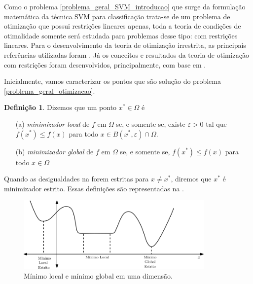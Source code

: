 \documentclass[12pt,a4paper]{scrartcl}
\theoremstyle{definition}%
\newtheorem{defi}{Definição}
\begin{document}
Como o problema \eqref{problema_geral_SVM_introducao} que surge da formulação matemática da técnica SVM para classificação trata-se de um problema de otimização que possui restrições lineares apenas, toda a teoria de condições de otimalidade somente será estudada para problemas desse tipo: com restrições lineares. Para o desenvolvimento da teoria de otimização irrestrita, as principais referências utilizadas foram \textcite{Izmailov2014ac,Ademir2013}. Já os conceitos e resultados da teoria de otimização com restrições foram desenvolvidos, principalmente, com base em \textcite{Ana1994,luenberger2008linear}.  

Inicialmente, vamos caracterizar os pontos que são solução do problema \eqref{problema_geral_otimizacao}.

\begin{defi} \label{defi:minimizador_local_global}
Dizemos que um ponto $x^{*} \in \Omega$ é
\begin{enumerate}
	\item[(a)] \emph{minimizador local} de $f$ em $\Omega$ se, e somente se, existe $\varepsilon >0$ tal que $f(x^{*}) \leq f(x)$ para todo $x \in B(x^{*}, \varepsilon) \cap \Omega$.

	\item[(b)] \emph{minimizador global} de $f$ em $\Omega$ se, e somente se, $f(x^{*}) \leq f(x)$ para todo $x \in \Omega$
\end{enumerate} 
\end{defi}

Quando as desigualdades na  forem estritas para $x \neq x^{*}$, diremos que $x^{*}$ é minimizador estrito. Essas definições são representadas na .

\begin{figure}[!ht] 
	\centering
	\includegraphics[width=0.86\textwidth]{grafico_minimo_local_global}
	\caption{ Mínimo local e mínimo global em uma dimensão. \label{fig:grafico_minimo_local_global}}
\end{figure}
\end{document}
